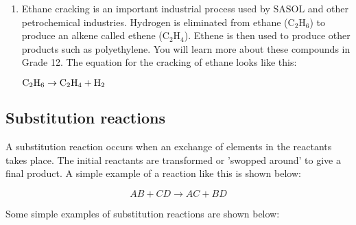 \begin{enumerate}
{%
% 
% 

}

\item{Ethane cracking is an important industrial process used by SASOL and other petrochemical industries. Hydrogen is eliminated from ethane (C$_{2}$H$_{6}$) to produce an alkene called ethene (C$_{2}$H$_{4}$). Ethene is then used to produce other products such as polyethylene. You will learn more about these compounds in Grade 12. The equation for the cracking of ethane looks like this:

\begin{center}
$\rm{C_{2}H_{6} \rightarrow C_{2}H_{4} + H_{2}}$
\end{center}
}

\end{enumerate}

\subsection{Substitution reactions}

A substitution reaction occurs when an exchange of elements in the reactants takes place. The initial reactants are transformed or 'swopped around' to give a final product. A simple example of a reaction like this is shown below:

\begin{equation*}
AB + CD \rightarrow AC + BD
\end{equation*}

Some simple examples of substitution reactions are shown below:

